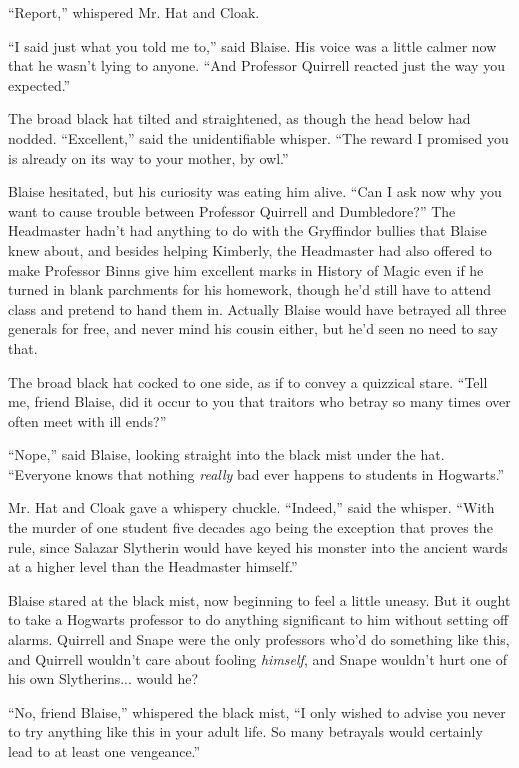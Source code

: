 ``Report,'' whispered Mr. Hat and Cloak.

``I said just what you told me to,'' said Blaise. His voice was a little calmer now that he wasn't lying to anyone. ``And Professor Quirrell reacted just the way you expected.''

The broad black hat tilted and straightened, as though the head below had nodded. ``Excellent,'' said the unidentifiable whisper. ``The reward I promised you is already on its way to your mother, by owl.''

Blaise hesitated, but his curiosity was eating him alive. ``Can I ask now why you want to cause trouble between Professor Quirrell and Dumbledore?'' The Headmaster hadn't had anything to do with the Gryffindor bullies that Blaise knew about, and besides helping Kimberly, the Headmaster had also offered to make Professor Binns give him excellent marks in History of Magic even if he turned in blank parchments for his homework, though he'd still have to attend class and pretend to hand them in. Actually Blaise would have betrayed all three generals for free, and never mind his cousin either, but he'd seen no need to say that.

The broad black hat cocked to one side, as if to convey a quizzical stare. ``Tell me, friend Blaise, did it occur to you that traitors who betray so many times over often meet with ill ends?''

``Nope,'' said Blaise, looking straight into the black mist under the hat. ``Everyone knows that nothing \emph{really} bad ever happens to students in Hogwarts.''

Mr. Hat and Cloak gave a whispery chuckle. ``Indeed,'' said the whisper. ``With the murder of one student five decades ago being the exception that proves the rule, since Salazar Slytherin would have keyed his monster into the ancient wards at a higher level than the Headmaster himself.''

Blaise stared at the black mist, now beginning to feel a little uneasy. But it ought to take a Hogwarts professor to do anything significant to him without setting off alarms. Quirrell and Snape were the only professors who'd do something like this, and Quirrell wouldn't care about fooling \emph{himself}, and Snape wouldn't hurt one of his own Slytherins... would he?

``No, friend Blaise,'' whispered the black mist, ``I only wished to advise you never to try anything like this in your adult life. So many betrayals would certainly lead to at least one vengeance.''

